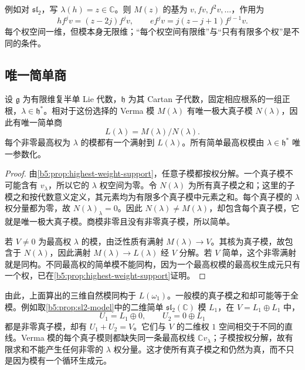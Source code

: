 \ProseParagraphBreak
例如对 \(\mathfrak{sl}_2\)，写 \(\lambda(h)=z\in\mathbb C\)。则 \(M(z)\) 的基为 \(v,fv,f^2v,\ldots\)，作用为
\begin{equation}\label{b5:eq:sl2-verma-actions}
	h f^jv=(z-2j)f^jv,\qquad e f^jv=j(z-j+1)f^{j-1}v.
\end{equation}
每个权空间一维，但模本身无限维；“每个权空间有限维”与“只有有限多个权”是不同的条件。

\subsection{唯一简单商}
\label{b5:subsec:1803:02}

\begin{theorem}\label{b5:thm:verma-simple-quotient}
	设 \(\mathfrak g\) 为有限维复半单 Lie 代数，\(\mathfrak h\) 为其 Cartan 子代数，固定相应根系的一组正根，\(\lambda\in\mathfrak h^*\)。相对于这份选择的 Verma 模 \(M(\lambda)\) 有唯一极大真子模 \(N(\lambda)\)，因此有唯一简单商
	\[
		L(\lambda)=M(\lambda)/N(\lambda).
	\]
	每个非零最高权为 \(\lambda\) 的模都有一个满射到 \(L(\lambda)\)。所有简单最高权模由 \(\lambda\in\mathfrak h^*\) 唯一参数化。
\end{theorem}
\begin{proof}
	由\cref{b5:prop:highest-weight-support}，任意子模都按权分解。一个真子模不可能含有 \(v_\lambda\)，所以它的 \(\lambda\) 权空间为零。令 \(N(\lambda)\) 为所有真子模之和；这里的子模之和按代数意义定义，其元素均为有限多个真子模中元素之和。每个真子模的 \(\lambda\) 权分量都为零，故 \(N(\lambda)_\lambda=0\)。因此 \(N(\lambda)\ne M(\lambda)\)，却包含每个真子模，它就是唯一极大真子模。商模非零且没有非零真子模，所以简单。

	若 \(V\ne0\) 为最高权 \(\lambda\) 的模，由泛性质有满射 \(M(\lambda)\to V\)。其核为真子模，故包含于 \(N(\lambda)\)，因此满射 \(M(\lambda)\to L(\lambda)\) 经 \(V\) 分解。若 \(V\) 简单，这个非零满射就是同构。不同最高权的简单模不能同构，因为一个最高权模的最高权生成元只有一个权，已在\cref{b5:prop:highest-weight-support}证明。
\end{proof}

由此，上面算出的三维自然模同构于 \(L(\omega_1)\)。一般模的真子模之和却可能等于全模。例如取\cref{b5:prop:sl2-model}中的二维简单 \(\mathfrak{sl}_2(\mathbb C)\) 模 \(L_1\)，在 \(V=L_1\oplus L_1\) 中，
\[
	U_1=L_1\oplus0,\qquad U_2=0\oplus L_1
\]
都是非零真子模，却有 \(U_1+U_2=V\)。它们与 \(V\) 的二维权 \(1\) 空间相交于不同的直线。Verma 模的每个真子模则都缺失同一条最高权线 \(\mathbb Cv_\lambda\)；子模按权分解，故有限求和不能产生任何非零的 \(\lambda\) 权分量。这才使所有真子模之和仍然为真，而不只是因为模有一个循环生成元。

